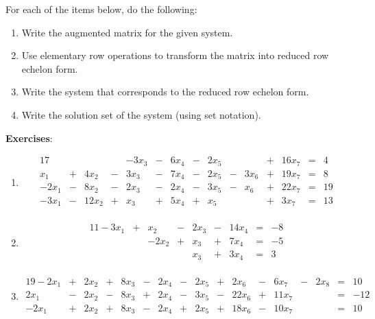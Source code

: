 \documentclass[12pt]{article}
\begin{document}
For each of the items below, do the following:
\begin{enumerate}
\item Write the augmented matrix for the given system.
\item Use elementary row operations to transform the matrix into reduced row echelon form.
\item Write the system that corresponds to the reduced row echelon form.
\item Write the solution set of the system (using set notation).
\end{enumerate}

\textbf{Exercises}:
\begin{enumerate}
\item \begin{alignat*}{17}
&{}{}&&{}{}&- 3 x_{3} &{}-{}& 6 x_{4} &{}-{}& 2 x_{5}&{}{}& &{}+{}& 16 x_{7} &{}={}&4\\ 
x_{1} &{}+{}& 4 x_{2} &{}-{}& 3 x_{3} &{}-{}& 7 x_{4} &{}-{}& 2 x_{5} &{}-{}& 3 x_{6} &{}+{}& 19 x_{7} &{}={}&8\\ 
- 2 x_{1} &{}-{}& 8 x_{2} &{}-{}& 2 x_{3} &{}-{}& 2 x_{4} &{}-{}& 3 x_{5} &{}-{}& x_{6} &{}+{}& 22 x_{7} &{}={}&19\\ 
- 3 x_{1} &{}-{}& 12 x_{2} &{}+{}& x_{3} &{}+{}& 5 x_{4} &{}+{}& x_{5}&{}{}& &{}+{}& 3 x_{7} &{}={}&13\\ 
\end{alignat*}

\item \begin{alignat*}{11}
- 3 x_{1} &{}+{}& x_{2} &{}-{}& 2 x_{3} &{}-{}& 14 x_{4} &{}={}&-8\\ 
&{}{}&- 2 x_{2} &{}+{}& x_{3} &{}+{}& 7 x_{4} &{}={}&-5\\ 
&{}{}&&{}{}&x_{3} &{}+{}& 3 x_{4} &{}={}&3\\ 
\end{alignat*}

\item \begin{alignat*}{19}
- 2 x_{1} &{}+{}& 2 x_{2} &{}+{}& 8 x_{3} &{}-{}& 2 x_{4} &{}-{}& 2 x_{5} &{}+{}& 2 x_{6} &{}-{}& 6 x_{7} &{}-{}& 2 x_{8} &{}={}&10\\ 
2 x_{1} &{}-{}& 2 x_{2} &{}-{}& 8 x_{3} &{}+{}& 2 x_{4} &{}-{}& 3 x_{5} &{}-{}& 22 x_{6} &{}+{}& 11 x_{7}&{}{}& &{}={}&-12\\ 
- 2 x_{1} &{}+{}& 2 x_{2} &{}+{}& 8 x_{3} &{}-{}& 2 x_{4} &{}+{}& 2 x_{5} &{}+{}& 18 x_{6} &{}-{}& 10 x_{7}&{}{}& &{}={}&10\\ 
\end{alignat*}


\end{enumerate}
\end{document}
